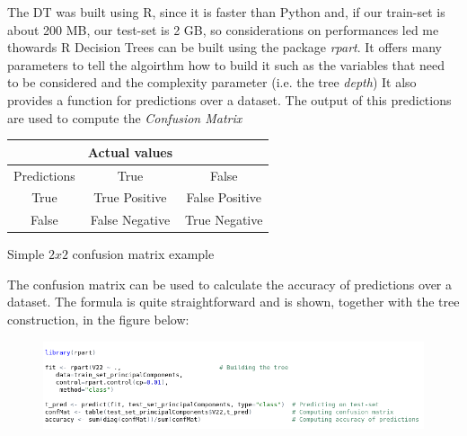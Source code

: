 	\begin{frame}
		The DT was built using R, since it is faster than Python and, if our train-set is about 200 MB, our test-set is 2 GB, so considerations on performances led me thowards R\newline\newline
		Decision Trees can be built using the package \emph{rpart}. It offers many parameters to tell the algoirthm how to build it such as the variables that need to be considered and the complexity parameter (i.e. the tree \emph{depth})\newline\newline
		It also provides a function for predictions over a dataset. The output of this predictions are used to compute the \emph{Confusion Matrix}
		
\begin{center}
	{\setlength{\extrarowheight}{20pt}
	\begin{tabular}{| c | c  c |}
	\hline
		 & Actual values & \\ \hline
		Predictions & True & False  \\ \hline
		True & True Positive & False Positive \\ \hline
		False & False Negative & True Negative \\ 
		\hline
	\end{tabular}}\par
	\bigskip
	
	\begin{tiny}
		Simple $2x2$ confusion matrix example
	\end{tiny}
	\end{center}
	\end{frame}
	
	\begin{frame}
		The confusion matrix can be used to calculate the accuracy of predictions over a dataset. The formula is quite straightforward and is shown, together with the tree construction, in the figure below:
		
		\begin{figure}
			\includegraphics[width=\textwidth,height=\textheight,keepaspectratio]{img/Rpart.png}
		\end{figure}
	\end{frame}
	
